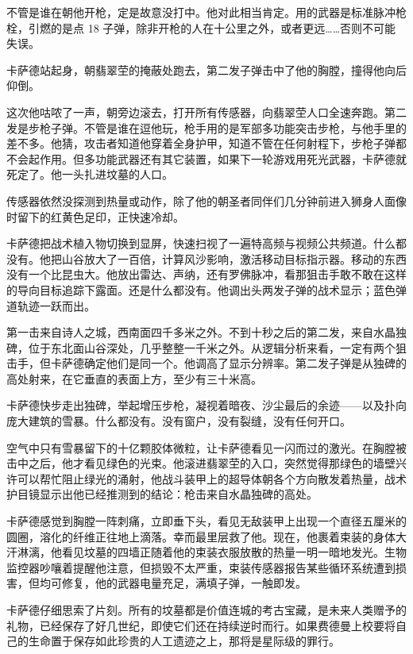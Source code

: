 \documentclass[AutoFakeBold=true]{book}
\begin{document}
不管是谁在朝他开枪，定是故意没打中。他对此相当肯定。用的武器是标准脉冲枪栓，引燃的是点 18 子弹，除非开枪的人在十公里之外，或者更远……否则不可能失误。

卡萨德站起身，朝翡翠茔的掩蔽处跑去，第二发子弹击中了他的胸膛，撞得他向后仰倒。

这次他咕哝了一声，朝旁边滚去，打开所有传感器，向翡翠茔人口全速奔跑。第二发是步枪子弹。不管是谁在逗他玩，枪手用的是军部多功能突击步枪，与他手里的差不多。他猜，攻击者知道他穿着全身护甲，知道不管在任何射程下，步枪子弹都不会起作用。但多功能武器还有其它装置，如果下一轮游戏用死光武器，卡萨德就死定了。他一头扎进坟墓的人口。

传感器依然没探测到热量或动作，除了他的朝圣者同伴们几分钟前进入狮身人面像时留下的红黄色足印，正快速冷却。

卡萨德把战术植入物切换到显屏，快速扫视了一遍特高频与视频公共频道。什么都没有。他把山谷放大了一百倍，计算风沙影响，激活移动目标指示器。移动的东西没有一个比昆虫大。他放出雷达、声纳，还有罗佛脉冲，看那狙击手敢不敢在这样的导向目标追踪下露面。还是什么都没有。他调出头两发子弹的战术显示；蓝色弹道轨迹一跃而出。

第一击来自诗人之城，西南面四千多米之外。不到十秒之后的第二发，来自水晶独碑，位于东北面山谷深处，几乎整整一千米之外。从逻辑分析来看，一定有两个狙击手，但卡萨德确定他们是同一个。他调高了显示分辨率。第二发子弹是从独碑的高处射来，在它垂直的表面上方，至少有三十米高。

卡萨德快步走出独碑，举起增压步枪，凝视着暗夜、沙尘最后的余迹——以及扑向庞大建筑的雪暴。什么都没有。没有窗户，没有裂缝，没有任何开口。

空气中只有雪暴留下的十亿颗胶体微粒，让卡萨德看见一闪而过的激光。在胸膛被击中{\kaishu 之后}，他才看见绿色的光束。他滚进翡翠茔的入口，突然觉得那绿色的墙壁兴许可以帮忙阻止绿光的涌射，他战斗装甲上的超导体朝各个方向散发着热量，战术护目镜显示出他已经推测到的结论：枪击来自水晶独碑的高处。

卡萨德感觉到胸膛一阵刺痛，立即垂下头，看见无敌装甲上出现一个直径五厘米的圆圈，溶化的纤维正往地上滴落。幸而最里层救了他。现在，他裹着束装的身体大汗淋漓，他看见坟墓的四墙正随着他的束装衣服放散的热量一明一暗地发光。生物监控器吵嚷着提醒他注意，但损毁不太严重，束装传感器报告某些循环系统遭到损害，但均可修复，他的武器电量充足，满填子弹，一触即发。

卡萨德仔细思索了片刻。所有的坟墓都是价值连城的考古宝藏，是未来人类赠予的礼物，已经保存了好几世纪，即使它们还在{\kaishu 持续}逆时而行。如果费德曼上校要将自己的生命置于保存如此珍贵的人工遗迹之上，那将是星际级的罪行。
\end{document}
